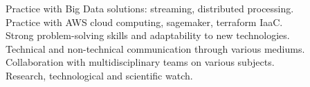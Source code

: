 \documentclass[11 pt,oneside,a4paper,titlepage]{article}
\begin{document}
{\begin{minipage}{12.3cm}
\begin{minipage}{12cm}
\begin{spacing}{1.3}
                {\bullet} Practice with Big Data solutions: streaming, distributed processing.\\
                {\bullet} Practice with AWS cloud computing, sagemaker, terraform IaaC.\\     
                {\bullet} Strong problem-solving skills and adaptability to new technologies.\\           
                {\bullet} Technical and non-technical communication through various mediums.\\
                {\bullet} Collaboration with multidisciplinary teams on various subjects.\\
                {\bullet} Research, technological and scientific watch.

\end{spacing}
\end{minipage}
\end{minipage}}
\end{document}

